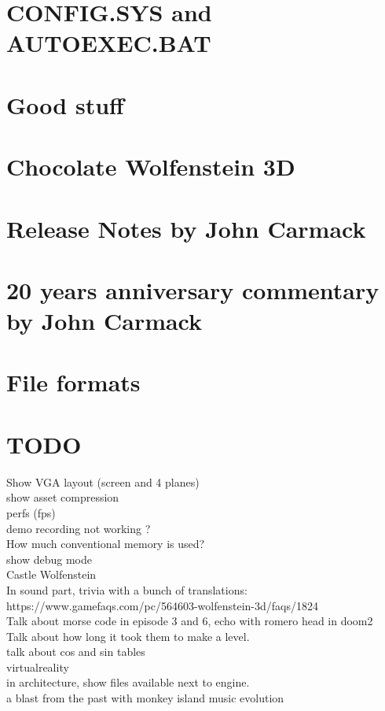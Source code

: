 \documentclass[8pt]{book}
\begin{document}
    \chapter{CONFIG.SYS and AUTOEXEC.BAT}
         
    \chapter{Good stuff}
          
    \chapter{Chocolate Wolfenstein 3D}
    \chapter{Release Notes by John Carmack}
        
    \chapter{20 years anniversary commentary by John Carmack}
        
    
    \chapter{File formats}
    
        
            
    
                    
        
                            
    
    \chapter{TODO}
    Show VGA layout (screen and 4 planes)\\
    show asset compression\\
    perfs (fps)\\
demo recording not working ?\\
How much conventional memory is used?\\
show debug mode\\
Castle Wolfenstein\\
In sound part, trivia with a bunch of translations: https://www.gamefaqs.com/pc/564603-wolfenstein-3d/faqs/1824\\
Talk about morse code in episode 3 and 6, echo with romero head in doom2\\
Talk about how long it took them to make a level.\\
talk about cos and sin tables\\
virtualreality\\
in architecture, show files available next to engine.\\
a blast from the past with monkey island music evolution\\


\end{document}
